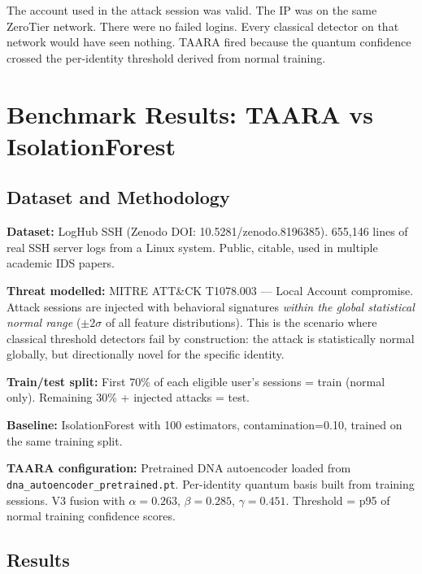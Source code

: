\documentclass[11pt,a4paper]{article}
\begin{document}
The account used in the attack session was valid. The IP was on the same ZeroTier network. There were no failed logins. Every classical detector on that network would have seen nothing. TAARA fired because the quantum confidence crossed the per-identity threshold derived from normal training.

\section{Benchmark Results: TAARA vs IsolationForest}

\subsection{Dataset and Methodology}

\textbf{Dataset:} LogHub SSH (Zenodo DOI: 10.5281/zenodo.8196385). 655,146 lines of real SSH server logs from a Linux system. Public, citable, used in multiple academic IDS papers.

\textbf{Threat modelled:} MITRE ATT\&CK T1078.003 — Local Account compromise. Attack sessions are injected with behavioral signatures \textit{within the global statistical normal range} ($\pm 2\sigma$ of all feature distributions). This is the scenario where classical threshold detectors fail by construction: the attack is statistically normal globally, but directionally novel for the specific identity.

\textbf{Train/test split:} First 70\% of each eligible user's sessions = train (normal only). Remaining 30\% + injected attacks = test.

\textbf{Baseline:} IsolationForest with 100 estimators, contamination=0.10, trained on the same training split.

\textbf{TAARA configuration:} Pretrained DNA autoencoder loaded from \texttt{dna\_autoencoder\_pretrained.pt}. Per-identity quantum basis built from training sessions. V3 fusion with $\alpha=0.263$, $\beta=0.285$, $\gamma=0.451$. Threshold = p95 of normal training confidence scores.

\subsection{Results}

\end{document}
